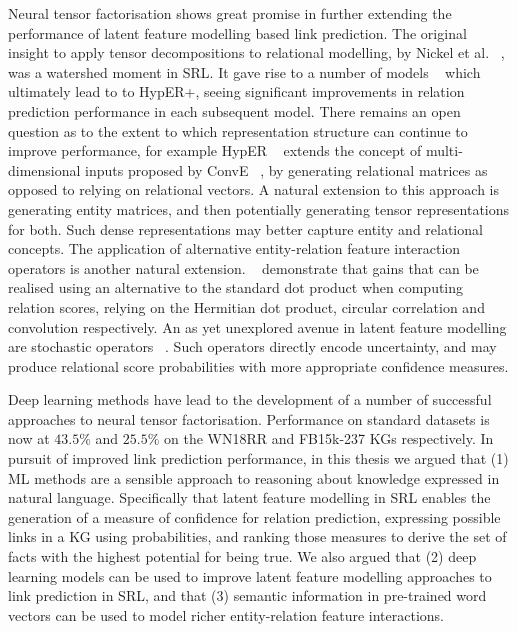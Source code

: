 \noindent Neural tensor factorisation shows great promise in further extending the performance of latent feature modelling based link prediction. The original insight to apply tensor decompositions to relational modelling, by Nickel et al. \unskip~\citep{nickel2011three}, was a watershed moment in SRL. It gave rise to a number of models \unskip~\citep{bordes2011learning, jenatton2012latent, socher2013reasoning, trouillon2016complex, hohenecker2017deep, dettmers2018convolutional, balazevic2019hypernetwork} which ultimately lead to to HypER+, seeing significant improvements in relation prediction performance in each subsequent model. There remains an open question as to the extent to which representation structure can continue to improve performance, for example HypER \unskip~\citep{balazevic2019hypernetwork} extends the concept of multi-dimensional inputs proposed by ConvE \unskip~\citep{dettmers2018convolutional}, by generating relational matrices as opposed to relying on relational vectors. A natural extension to this approach is generating entity matrices, and then potentially generating tensor representations for both. Such dense representations may better capture entity and relational concepts. The application of alternative entity-relation feature interaction operators is another natural extension. \unskip~\citep{trouillon2016complex, nickel2016holographic, dettmers2018convolutional} demonstrate that gains that can be realised using an alternative to the standard dot product when computing relation scores, relying on the Hermitian dot product, circular correlation and convolution respectively. An as yet unexplored avenue in latent feature modelling are stochastic operators \unskip~\citep{kingma2013auto}. Such operators directly encode uncertainty, and may produce relational score probabilities with more appropriate confidence measures. \par

\noindent Deep learning methods have lead to the development of a number of successful approaches to neural tensor factorisation. Performance on standard datasets is now at $ 43.5\% $ and $ 25.5\% $ on the WN18RR and FB15k-237 KGs respectively. In pursuit of improved link prediction performance, in this thesis we argued that (1) ML methods are a sensible approach to reasoning about knowledge expressed in natural language. Specifically that latent feature modelling in SRL enables the generation of a measure of confidence for relation prediction, expressing possible links in a KG using probabilities, and ranking those measures to derive the set of facts with the highest potential for being true. We also argued that (2) deep learning models can be used to improve latent feature modelling approaches to link prediction in SRL, and that (3) semantic information in pre-trained word vectors can be used to model richer entity-relation feature interactions. \par

